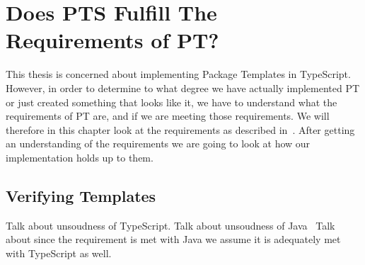 \chapter{Does PTS Fulfill The Requirements of PT?}\label{ch:does-pts-fulfill-the-requirements-of-pt?}

This thesis is concerned about implementing Package Templates in TypeScript.
However, in order to determine to what degree we have actually implemented PT or just created something that looks like it, we have to understand what the requirements of PT are, and if we are meeting those requirements.
We will therefore in this chapter look at the requirements as described in~\cite{jot}.
After getting an understanding of the requirements we are going to look at how our implementation holds up to them.



\section{Verifying Templates}\label{sec:pt-requirements-verifying-templates}

Talk about unsoudness of TypeScript.
Talk about unsoudness of Java~\cite{java-unsound}
Talk about since the requirement is met with Java we assume it is adequately met with TypeScript as well.

